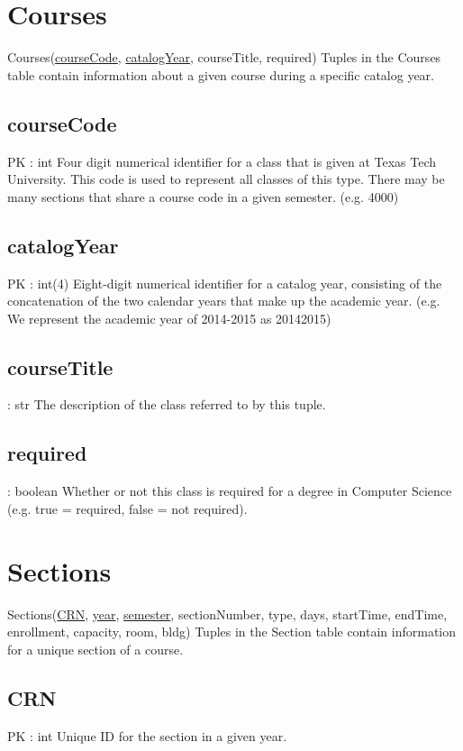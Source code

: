\section{Courses}
	Courses(\underline{courseCode}, \underline{catalogYear}, courseTitle, required) 
		Tuples in the Courses table contain information about a given course during a specific catalog year.

	\subsection{courseCode}
		PK : int 
		Four digit numerical identifier for a class that is given at Texas Tech University. This code is used to represent all classes of this type. There may be many sections that share a course code in a given semester. (e.g. 4000)	
		
	\subsection{catalogYear}
		PK : int(4) 
		Eight-digit numerical identifier for a catalog year, consisting of the concatenation of the two calendar years that make up the academic year. (e.g. We represent the academic year of 2014-2015 as 20142015)
		
	\subsection{courseTitle}	
		: str 
		The description of the class referred to by this tuple.
		
	\subsection{required}
		: boolean
		Whether or not this class is required for a degree in Computer Science (e.g. true = required, false = not required).
	
	
\section{Sections}
	Sections(\underline{CRN}, \underline{year}, \underline{semester}, sectionNumber, type, days, startTime, endTime, enrollment, capacity, room, bldg) 
		Tuples in the Section table contain information for a unique section of a course.

	\subsection{CRN}
		PK : int  
		Unique ID for the section in a given year.
	
